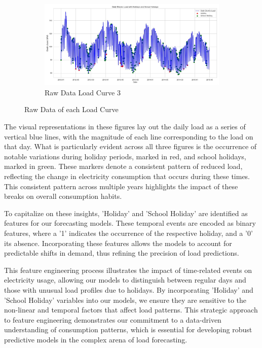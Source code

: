 \documentclass{article} %
\begin{document}
\begin{figure}[!htb]
\begin{subfigure}[b]{\textwidth}
        \centering
        \includegraphics[width=\textwidth]{ressources/Holiday/lectricLoad_holiday(2).jpg}
        \caption{Raw Data Load Curve 3}
        \label{fig:RawData3}
    \end{subfigure}
    \caption{Raw Data of each Load Curve}
    \label{fig:RawData}
\end{figure}

The visual representations in these figures lay out the daily load as a series of vertical blue lines, with the magnitude of each line corresponding to the load on that day. What is particularly evident across all three figures is the occurrence of notable variations during holiday periods, marked in red, and school holidays, marked in green. These markers denote a consistent pattern of reduced load, reflecting the change in electricity consumption that occurs during these times. This consistent pattern across multiple years highlights the impact of these breaks on overall consumption habits. 

To capitalize on these insights, 'Holiday' and 'School Holiday' are identified as features for our forecasting models. These temporal events are encoded as binary features, where a '1' indicates the occurrence of the respective holiday, and a '0' its absence. Incorporating these features allows the models to account for predictable shifts in demand, thus refining the precision of load predictions. 

This feature engineering process illustrates the impact of time-related events on electricity usage, allowing our models to distinguish between regular days and those with unusual load profiles due to holidays. By incorporating 'Holiday' and 'School Holiday' variables into our models, we ensure they are sensitive to the non-linear and temporal factors that affect load patterns. This strategic approach to feature engineering demonstrates our commitment to a data-driven understanding of consumption patterns, which is essential for developing robust predictive models in the complex arena of load forecasting. 
\end{document}
